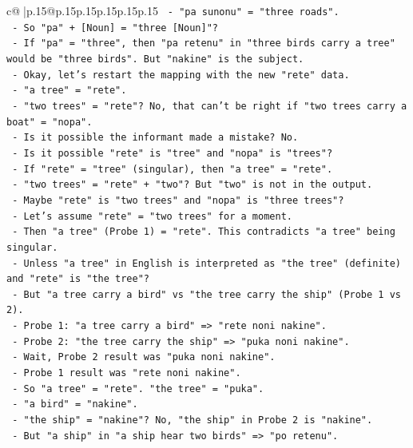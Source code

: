 \documentclass{article}
\begin{document}
{\begin{supertabular}{c@{$\;$}|p{.15\linewidth}@{}p{.15\linewidth}p{.15\linewidth}p{.15\linewidth}p{.15\linewidth}p{.15\linewidth}}
{{{\texttt{   {-} "pa sunonu" = "three roads".} \\
\texttt{   {-} So "pa" + {[}Noun{]} = "three {[}Noun{]}"?} \\
\texttt{   {-} If "pa" = "three", then "pa retenu" in "three birds carry a tree" would be "three birds". But "nakine" is the subject.} \\
\texttt{   {-} Okay, let's restart the mapping with the new "rete" data.} \\
\texttt{   {-} "a tree" = "rete".} \\
\texttt{   {-} "two trees" = "rete"? No, that can't be right if "two trees carry a boat" = "nopa".} \\
\texttt{   {-} Is it possible the informant made a mistake? No.} \\
\texttt{   {-} Is it possible "rete" is "tree" and "nopa" is "trees"?} \\
\texttt{   {-} If "rete" = "tree" (singular), then "a tree" = "rete".} \\
\texttt{   {-} "two trees" = "rete" + "two"? But "two" is not in the output.} \\
\texttt{   {-} Maybe "rete" is "two trees" and "nopa" is "three trees"?} \\
\texttt{   {-} Let's assume "rete" = "two trees" for a moment.} \\
\texttt{   {-} Then "a tree" (Probe 1) = "rete". This contradicts "a tree" being singular.} \\
\texttt{   {-} Unless "a tree" in English is interpreted as "the tree" (definite) and "rete" is "the tree"?} \\
\texttt{   {-} But "a tree carry a bird" vs "the tree carry the ship" (Probe 1 vs 2).} \\
\texttt{   {-} Probe 1: "a tree carry a bird" => "rete noni nakine".} \\
\texttt{   {-} Probe 2: "the tree carry the ship" => "puka noni nakine".} \\
\texttt{   {-} Wait, Probe 2 result was "puka noni nakine".} \\
\texttt{   {-} Probe 1 result was "rete noni nakine".} \\
\texttt{   {-} So "a tree" = "rete". "the tree" = "puka".} \\
\texttt{   {-} "a bird" = "nakine".} \\
\texttt{   {-} "the ship" = "nakine"? No, "the ship" in Probe 2 is "nakine".} \\
\texttt{   {-} But "a ship" in "a ship hear two birds" => "po retenu".} \\
}}}
\end{supertabular}}
\end{document}
